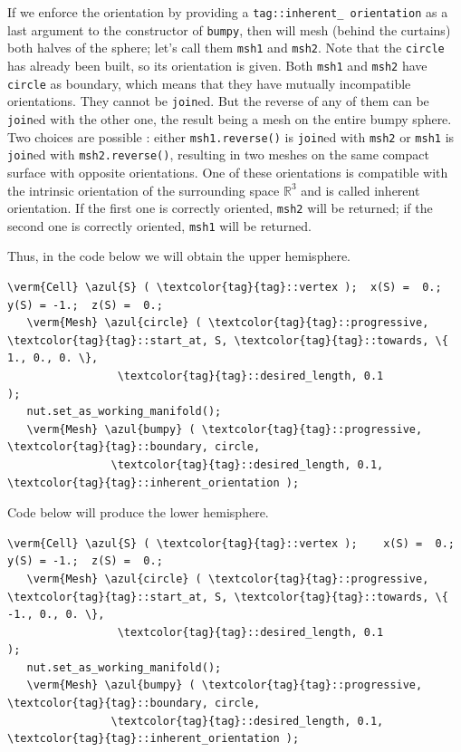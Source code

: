 If we enforce the orientation by providing a {\small\tt \textcolor{tag}{tag}::inherent\_\,orientation} as a last
argument to the {\small\tt {}} constructor of {\small\tt bumpy}, then {\maniFEM} will mesh
(behind the curtains) both halves of the sphere; let's call them {\small\tt msh1} and {\small\tt msh2}.
Note that the {\small\tt circle} has already been built, so its orientation is given.
Both {\small\tt msh1} and {\small\tt msh2} have {\small\tt circle} as boundary,
which means that they have mutually incompatible orientations.
They cannot be {\small\tt join}ed.
But the reverse of any of them can be {\small\tt join}ed with the other one, the result being a
mesh on the entire bumpy sphere.
Two choices are possible : either {\small\tt msh1.reverse()} is {\small\tt join}ed with {\small\tt msh2}
or {\small\tt msh1} is {\small\tt join}ed with {\small\tt msh2.reverse()}, resulting in two meshes on
the same compact surface with opposite orientations.
One of these orientations is compatible with the intrinsic orientation of the surrounding space
$ \mathbb{R}^3 $ and is called inherent orientation.
If the first one is correctly oriented, {\small\tt msh2} will be returned;
if the second one is correctly oriented, {\small\tt msh1} will be returned.

Thus, in the code below we will obtain the upper hemisphere.

\begin{Verbatim}[commandchars=\\\{\},formatcom=\small\tt,
   baselinestretch=0.94,framesep=2mm                      ]
   \verm{Cell} \azul{S} ( \textcolor{tag}{tag}::vertex );  x(S) =  0.;  y(S) = -1.;  z(S) =  0.;
   \verm{Mesh} \azul{circle} ( \textcolor{tag}{tag}::progressive, \textcolor{tag}{tag}::start_at, S, \textcolor{tag}{tag}::towards, \{ 1., 0., 0. \},
                 \textcolor{tag}{tag}::desired_length, 0.1                                         );
   nut.set_as_working_manifold();
   \verm{Mesh} \azul{bumpy} ( \textcolor{tag}{tag}::progressive, \textcolor{tag}{tag}::boundary, circle,
                \textcolor{tag}{tag}::desired_length, 0.1, \textcolor{tag}{tag}::inherent_orientation );
\end{Verbatim}

Code below will produce the lower hemisphere.

\begin{Verbatim}[commandchars=\\\{\},formatcom=\small\tt,
   baselinestretch=0.94,framesep=2mm                      ]
   \verm{Cell} \azul{S} ( \textcolor{tag}{tag}::vertex );    x(S) =  0.;  y(S) = -1.;  z(S) =  0.;
   \verm{Mesh} \azul{circle} ( \textcolor{tag}{tag}::progressive, \textcolor{tag}{tag}::start_at, S, \textcolor{tag}{tag}::towards, \{ -1., 0., 0. \},
                 \textcolor{tag}{tag}::desired_length, 0.1                                          );
   nut.set_as_working_manifold();
   \verm{Mesh} \azul{bumpy} ( \textcolor{tag}{tag}::progressive, \textcolor{tag}{tag}::boundary, circle,
                \textcolor{tag}{tag}::desired_length, 0.1, \textcolor{tag}{tag}::inherent_orientation );
\end{Verbatim}

